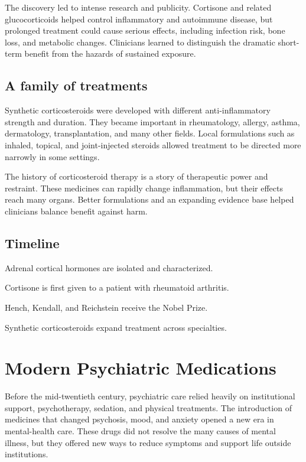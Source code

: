 \documentclass[12pt,oneside]{book}
\begin{document}
The discovery led to intense research and publicity. Cortisone and related
glucocorticoids helped control inflammatory and autoimmune disease, but
prolonged treatment could cause serious effects, including infection risk,
bone loss, and metabolic changes. Clinicians learned to distinguish the
dramatic short-term benefit from the hazards of sustained exposure.

\section{A family of treatments}
Synthetic corticosteroids were developed with different anti-inflammatory strength and duration. They became important in rheumatology, allergy, asthma, dermatology, transplantation, and many other fields. Local formulations such as inhaled, topical, and joint-injected steroids allowed treatment to be directed more narrowly in some settings.

The history of corticosteroid therapy is a story of therapeutic power and
restraint. These medicines can rapidly change inflammation, but their effects
reach many organs. Better formulations and an expanding evidence base helped
clinicians balance benefit against harm.

\section*{Timeline}
\begin{description}[leftmargin=2.3cm,style=nextline]
  \item[1930s--1940s] Adrenal cortical hormones are isolated and characterized.
  \item[1948] Cortisone is first given to a patient with rheumatoid arthritis.
  \item[1950] Hench, Kendall, and Reichstein receive the Nobel Prize.
  \item[1950s onward] Synthetic corticosteroids expand treatment across specialties.
\end{description}
\chapter[Modern Psychiatric Medications]{Modern Psychiatric Medications}

Before the mid-twentieth century, psychiatric care relied heavily on
institutional support, psychotherapy, sedation, and physical treatments. The
introduction of medicines that changed psychosis, mood, and anxiety opened a
new era in mental-health care. These drugs did not resolve the many causes of
mental illness, but they offered new ways to reduce symptoms and support life
outside institutions.
\end{document}

